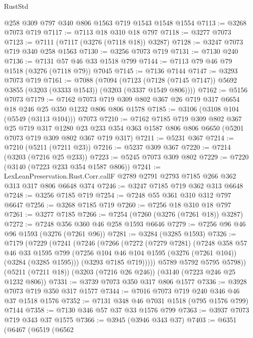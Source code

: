 \begin{lexlean}{RustStd}
\begin{coremodule}
    @258
    @309
    @797
    @340
    @806
    @1563
    @719
    @1543
    @1548
    @1554
@7113 := @3268 @7073 @719
@7117 := @7113 @18 @310 @18 @797
@7118 := @3277 @7073
@7123 := @7111 (@7117 (@3276 (@7118 @18)) @3287)
@7128 := @3247 @7073 @719 @340 @258 @1563
@7130 := @3256 @7073 @719
@7131 := @7130 @240
@7136 := @7131 @57 @46 @33 @1518 @799
@7144 := @7113 @79 @46 @79 @1518 (@3276 (@7118 @79)) @7045
@7145 := @7136 @7144
@7147 := @3293 @7073 @719
@7161 := @7088
    (@7094
      (@7123 (@7128 (@7145 @7147)) @5692 @3855 (@3203 (@3333 @1543)) (@3203 (@3337 @1549 @806))))
@7162 := @5156 @7073
@7179 := @7162 @7073 @719 @309 @802 @367 @26 @719 @317 @6654 @18 @246 @25 @350 @1232 @806 @806 @1578
@7185 := @3106 (@3108 @104 (@5549 (@3113 @104))) @7073
@7210 := @7162
    @7185
    @719
    @309
    @802
    @367
    @25
    @719
    @317
    @1280
    @23
    @233
    @354
    @363
    @1587
    @806
    @806
    @6650
    (@5201 @7073 @719 @309 @802 @367 @719 @317)
@7211 := @5231 @367
@7214 := @7210 (@5211 (@7211 @23))
@7216 := @5237 @309 @367
@7220 := @7214 (@3203 (@7216 @25 @233))
@7223 := @5245 @7073 @309 @802
@7229 := @7220 (@3140 (@7223 @233 @354 @1587 @806))
@7241 := LexLeanPreservation.Rust.Corr.callF
    @2789
    @2791
    @2793
    @7185
    @266
    @362
    @313
    @317
    @806
    @6648
    @374
@7246 := @3247 @7185 @719 @362 @313 @6648
@7248 := @3256 @7185 @719
@7254 := @7248 @55 @361 @310 @312 @797 @6647
@7256 := @3268 @7185 @719
@7260 := @7256 @18 @310 @18 @797
@7261 := @3277 @7185
@7266 := @7254 (@7260 (@3276 (@7261 @18)) @3287)
@7272 := @7248 @356 @360 @46 @258 @1593 @6646
@7279 := @7256 @96 @46 @96 @1593 (@3276 (@7261 @96))
@7281 := @3284 (@3285 @1593)
@7326 := @7179
    (@7229
      (@7241
        (@7246
          (@7266
            (@7272
              (@7279 @7281)
              (@7248
                @358
                @57
                @46
                @33
                @1595
                @799
                (@7256 @104 @46 @104 @1595 (@3276 (@7261 @104)) (@3284 (@3285 @1595)))
                (@3293 @7185 @719)))))
        @5789
        @5792
        @5795
        @5798))
    (@5211 (@7211 @18))
    (@3203 (@7216 @26 @246))
    (@3140 (@7223 @246 @25 @1232 @806))
@7331 := @3739 @7073 @350 @317 @806 @1577
@7336 := @3928 @7073 @719 @350 @317 @1577
@7344 := @7016 @7073 @719 @240 @346 @46 @37 @1518 @1576
@7352 := @7131 @348 @46 @7031 @1518 (@795 @1576 @799) @7144
@7358 := @7130 @346 @57 @37 @33 @1576 @799
@7363 := @3937 @7073 @719 @343 @37 @1575
@7366 := @3945 (@3946 @343 @37)
@7403 := @6351
    (@6467
      (@6519
        (@6562

\end{coremodule}
\end{lexlean}

